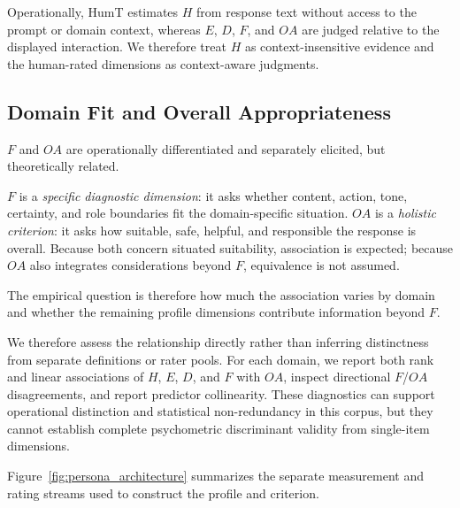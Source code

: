 \documentclass[manuscript,review,anonymous]{acmart}
\begin{document}
Operationally, HumT estimates $H$ from response text without access to the prompt or domain context, whereas $E$, $D$, $F$, and $OA$ are judged relative to the displayed interaction. We therefore treat $H$ as context-insensitive evidence and the human-rated dimensions as context-aware judgments.

\subsection{Domain Fit and Overall Appropriateness}

$F$ and $OA$ are operationally differentiated and separately elicited, but theoretically related.

$F$ is a \emph{specific diagnostic dimension}: it asks whether content, action, tone, certainty, and role boundaries fit the domain-specific situation. $OA$ is a \emph{holistic criterion}: it asks how suitable, safe, helpful, and responsible the response is overall. Because both concern situated suitability, association is expected; because $OA$ also integrates considerations beyond $F$, equivalence is not assumed.

The empirical question is therefore how much the association varies by domain and whether the remaining profile dimensions contribute information beyond $F$.

We therefore assess the relationship directly rather than inferring distinctness from separate definitions or rater pools. For each domain, we report both rank and linear associations of $H$, $E$, $D$, and $F$ with $OA$, inspect directional $F$/$OA$ disagreements, and report predictor collinearity. These diagnostics can support operational distinction and statistical non-redundancy in this corpus, but they cannot establish complete psychometric discriminant validity from single-item dimensions.

Figure~\ref{fig:persona_architecture} summarizes the separate measurement and rating streams used to construct the profile and criterion.
\end{document}
